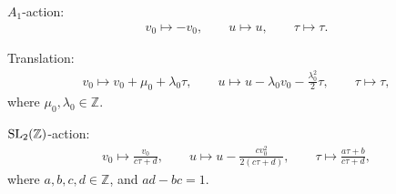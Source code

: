 \documentclass[pdftex]{sigma}%
\numberwithin{equation}{section}
\begin{document}
$A_1$-action:
\begin{gather}
\label{jacobi A1 b}
v_0\mapsto -v_0,\qquad
u\mapsto u, \qquad
\tau\mapsto\tau.
\end{gather}

Translation:
\begin{gather}
\label{jacobi trans b}
v_0\mapsto v_0+\mu_0+\lambda_0\tau,\qquad
u\mapsto u-\lambda_0v_0-\frac{\lambda_0^2}{2}\tau,\qquad
\tau\mapsto\tau,
\end{gather}
where $\mu_0,\lambda_0\in \mathbb{Z}$.

${\rm SL}_2(\mathbb{Z})$-action:
\begin{gather}
\label{jacobi sl2z b}
v_0\mapsto \frac{v_0}{c\tau+d},\qquad
u\mapsto u-\frac{cv_0^2}{2(c\tau+d)},\qquad
\tau\mapsto\frac{a\tau+b}{c\tau+d},
\end{gather}
where $a,b,c,d\in \mathbb{Z}$, and $ad-bc=1$.
\end{document}
